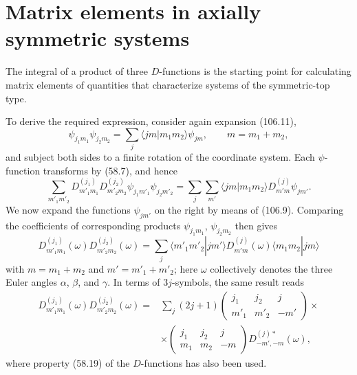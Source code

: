 \section{Matrix elements in axially symmetric systems}

The integral of a product of three $D$-functions is the starting point for calculating matrix elements of quantities that characterize systems of the symmetric-top type.

To derive the required expression, consider again expansion (106.11),
\[
 \psi_{j_1m_1}\psi_{j_2m_2}=\sum_j\langle jm|m_1m_2\rangle\psi_{jm},
 \qquad m=m_1+m_2,
\]
and subject both sides to a finite rotation of the coordinate system. Each $\psi$-function transforms by (58.7), and hence
\[
 \sum_{m'_1m'_2}D^{(j_1)}_{m'_1m_1}D^{(j_2)}_{m'_2m_2}
 \psi_{j_1m'_1}\psi_{j_2m'_2}
 =\sum_j\sum_{m'}\langle jm|m_1m_2\rangle D^{(j)}_{m'm}\psi_{jm'}.
\]
We now expand the functions $\psi_{jm'}$ on the right by means of (106.9). Comparing the coefficients of corresponding products $\psi_{j_1m_1}$, $\psi_{j_2m_2}$ then gives
\begin{equation}
 D^{(j_1)}_{m'_1m_1}(\omega)D^{(j_2)}_{m'_2m_2}(\omega)
 =\sum_j\langle m'_1m'_2|jm'\rangle D^{(j)}_{m'm}(\omega)
 \langle m_1m_2|jm\rangle
 \tag{110.1}
\end{equation}
with $m=m_1+m_2$ and $m'=m'_1+m'_2$; here $\omega$ collectively denotes the three Euler angles $\alpha$, $\beta$, and $\gamma$. In terms of $3j$-symbols, the same result reads
\begin{equation}
 \begin{aligned}
 D^{(j_1)}_{m'_1m_1}(\omega)D^{(j_2)}_{m'_2m_2}(\omega)
 ={}&\sum_j(2j+1)
 \begin{pmatrix}j_1&j_2&j\\m'_1&m'_2&-m'\end{pmatrix}\times\\
 &\times\begin{pmatrix}j_1&j_2&j\\m_1&m_2&-m\end{pmatrix}
 D^{(j)*}_{-m',-m}(\omega),
 \end{aligned}
 \tag{110.2}
\end{equation}
where property (58.19) of the $D$-functions has also been used.

